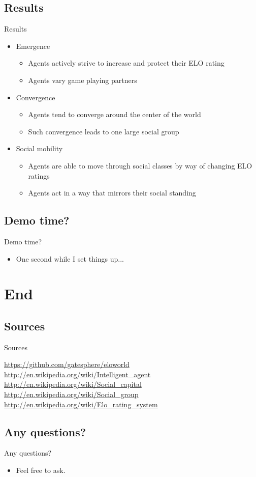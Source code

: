 \documentclass[12pt]{beamer}
\begin{document}
\subsection{Results}
\begin{frame}{Results}
  \begin{itemize}
    \item Emergence
    \begin{itemize}
      \item Agents actively strive to increase and protect their ELO rating
      \item Agents vary game playing partners
    \end{itemize}
    \item Convergence
    \begin{itemize}
      \item Agents tend to converge around the center of the world
      \item Such convergence leads to one large social group
    \end{itemize}
    \item Social mobility
    \begin{itemize}
      \item Agents are able to move through social classes by way of changing ELO ratings
      \item Agents act in a way that mirrors their social standing
    \end{itemize}
  \end{itemize}
\end{frame}

\subsection{Demo time?}
\begin{frame}{Demo time?}
  \begin{itemize}
    \item One second while I set things up...
  \end{itemize}
\end{frame}

\section{End}
\subsection{Sources}
\begin{frame}{Sources}
  \begin{thebibliography}{19}
     \url{https://github.com/gatesphere/eloworld}
     \url{http://en.wikipedia.org/wiki/Intelligent_agent}
     \url{http://en.wikipedia.org/wiki/Social_capital}
     \url{http://en.wikipedia.org/wiki/Social_group}
     \url{http://en.wikipedia.org/wiki/Elo_rating_system}
  \end{thebibliography}
\end{frame}

\subsection{Any questions?}
\begin{frame}{Any questions?}
  \begin{itemize}
    \item Feel free to ask.
  \end{itemize}
\end{frame}
\end{document}
